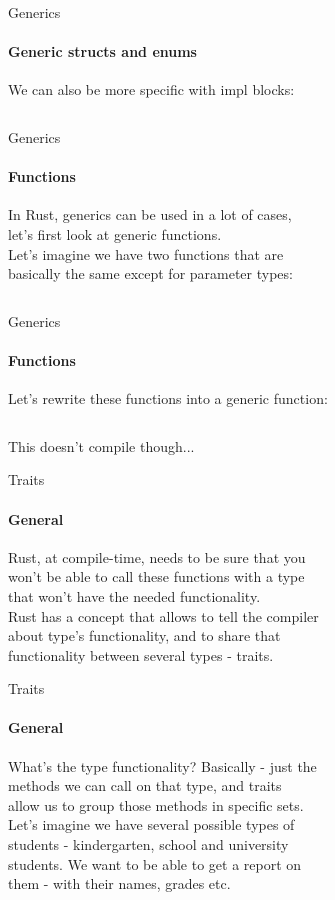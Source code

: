 \documentclass[usenames,dvipsnames,10pt,aspectratio=169]{beamer}
\begin{document}
\begin{frame}{Generics}
	\framesubtitle{Generic structs and enums}
	\large
	We can also be more specific with \textcolor{ucuyellow}{impl} blocks:
	\vspace{0.2cm}
	\inputminted[fontsize=\large]{rust}{code/generics3.rs}
\end{frame}

\begin{frame}{Generics}
	\framesubtitle{Functions}
	\large
	In Rust, generics can be used in a lot of cases,\\
	let's first look at \textcolor{ucuyellow}{generic functions}.\\
	\vspace{0.2cm}
	Let's imagine we have two functions that are\\
	basically the same except for parameter types:\\
	\vspace{0.2cm}
	\inputminted[fontsize=\large]{rust}{code/generics4.rs}
\end{frame}

\begin{frame}{Generics}
	\framesubtitle{Functions}
	\large
	Let's rewrite these functions into a generic function:\\
	\vspace{0.2cm}
	\inputminted[fontsize=\Large]{rust}{code/generics5.rs}
	\vspace{0.2cm}
	This doesn't compile though...\\
\end{frame}

\begin{frame}{Traits}
	\framesubtitle{General}
	\large
	Rust, at compile-time, needs to be sure that you\\
	won't be able to call these functions with a type\\
	that won't have the needed functionality.\\
	\vspace{0.3cm}
	Rust has a concept that allows to tell the compiler\\
	about type's functionality, and to share that\\
	functionality between several types - \textcolor{ucuyellow}{traits}.\\
\end{frame}	

\begin{frame}{Traits}
	\framesubtitle{General}
	\large
	What's the type functionality? Basically - just the\\
	methods we can call on that type, and traits\\
	allow us to group those methods in specific sets.\\
	\vspace{0.4cm}
	Let's imagine we have several possible types of\\
	students - kindergarten, school and university\\
	students. We want to be able to get a report on\\
	them - with their names, grades etc.\\
\end{frame}
\end{document}
